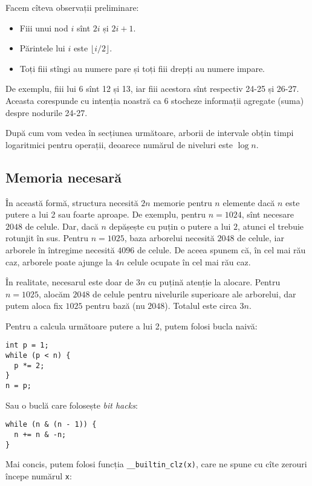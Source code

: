 Facem cîteva observații preliminare:

\begin{itemize}
  \item Fiii unui nod $i$ sînt $2i$ și $2i + 1$.
  \item Părintele lui $i$ este $\lfloor i / 2 \rfloor$.
  \item Toți fiii stîngi au numere pare și toți fiii drepți au numere impare.
\end{itemize}

De exemplu, fiii lui 6 sînt 12 și 13, iar fiii acestora sînt respectiv 24-25 și 26-27. Aceasta corespunde cu intenția noastră ca 6 stocheze informații agregate (suma) despre nodurile 24-27.

După cum vom vedea în secțiunea următoare, arborii de intervale obțin timpi logaritmici pentru operații, deoarece numărul de niveluri este $\log n$.

\subsection{Memoria necesară}

În această formă, structura necesită $2n$ memorie pentru $n$ elemente dacă $n$ este putere a lui 2 sau foarte aproape. De exemplu, pentru $n = 1024$, sînt necesare $2048$ de celule. Dar, dacă $n$ depășește cu puțin o putere a lui $2$, atunci el trebuie rotunjit în sus. Pentru $n = 1025$, baza arborelui necesită $2048$ de celule, iar arborele în întregime necesită $4096$ de celule. De aceea spunem că, în cel mai rău caz, arborele poate ajunge la $4n$ celule ocupate în cel mai rău caz.

În realitate, necesarul este doar de $3n$ cu puțină atenție la alocare. Pentru $n = 1025$, alocăm $2048$ de celule pentru nivelurile superioare ale arborelui, dar putem aloca fix $1025$ pentru bază (nu $2048$). Totalul este circa $3n$.

Pentru a calcula următoare putere a lui 2, putem folosi bucla naivă:

\begin{verbatim}
int p = 1;
while (p < n) {
  p *= 2;
}
n = p;
\end{verbatim}

Sau o buclă care folosește \textit{bit hacks}:

\begin{verbatim}
while (n & (n - 1)) {
  n += n & -n;
}
\end{verbatim}

Mai concis, putem folosi funcția \texttt{__builtin_clz(x)}, care ne spune cu cîte zerouri începe numărul \texttt{x}:

